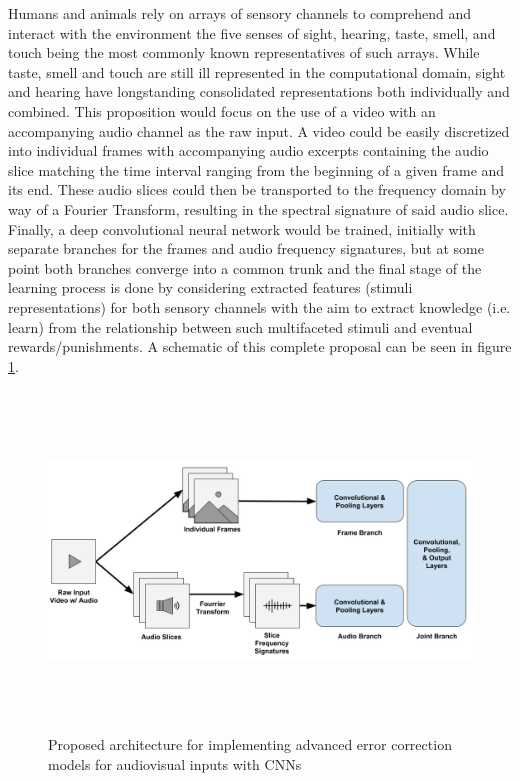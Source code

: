 \documentclass[10pt]{article}
\begin{document}
    Humans and animals rely on arrays of sensory channels to comprehend and interact with the environment the five senses of sight, hearing, taste, smell, and touch being the most commonly known representatives of such arrays. While taste, smell and touch are still ill represented in the computational domain, sight and hearing have longstanding consolidated representations both individually and combined. This proposition would focus on the use of a video with an accompanying audio channel as the raw input. A video could be easily discretized into individual frames with accompanying audio excerpts containing the audio slice matching the time interval ranging from the beginning of a given frame and its end. These audio slices could then be transported to the frequency domain by way of a Fourier Transform, resulting in the spectral signature of said audio slice. Finally, a deep convolutional neural network would be trained, initially with separate branches for the frames and audio frequency signatures, but at some point both branches converge into a common trunk and the final stage of the learning process is done by considering extracted features (stimuli representations) for both sensory channels with the aim to extract knowledge (i.e. learn) from the relationship between such multifaceted stimuli and eventual rewards/punishments. A schematic of this complete proposal can be seen in figure \ref{fig:proposal}.

    \begin{figure}[h]
        \centering
        \includegraphics[height=9cm]{Images/proposal/architecture_1_3.png}
        \caption{Proposed architecture for implementing advanced error correction models for audiovisual inputs with CNNs}
        \label{fig:proposal}
    \end{figure}
\end{document}
